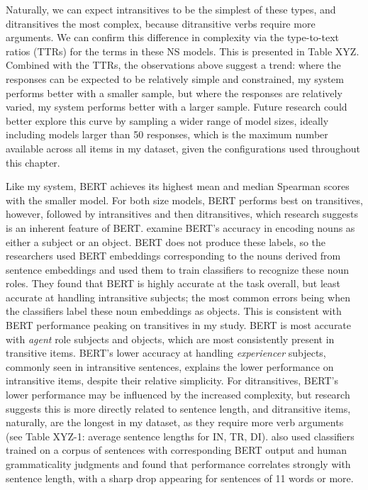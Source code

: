 Naturally, we can expect intransitives to be the simplest of these types, and ditransitives the most complex, because ditransitive verbs require more arguments. We can confirm this difference in complexity via the type-to-text ratios (TTRs) for the terms in these NS models. This is presented in Table XYZ. Combined with the TTRs, the observations above suggest a trend: where the responses can be expected to be relatively simple and constrained, my system performs better with a smaller sample, but where the responses are relatively varied, my system performs better with a larger sample. Future research could better explore this curve by sampling a wider range of model sizes, ideally including models larger than 50 responses, which is the maximum number available across all items in my dataset, given the configurations used throughout this chapter.

Like my system, BERT achieves its highest mean and median Spearman scores with the smaller model. For both size models, BERT performs best on transitives, however, followed by intransitives and then ditransitives, which research suggests is an inherent feature of BERT. \citet{papadimitriou2021multilingual} examine BERT's accuracy in encoding nouns as either a subject or an object. BERT does not produce these labels, so the researchers used BERT embeddings corresponding to the nouns derived from sentence embeddings and used them to train classifiers to recognize these noun roles. They found that BERT is highly accurate at the task overall, but least accurate at handling intransitive subjects; the most common errors being when the classifiers label these noun embeddings as objects. This is consistent with BERT performance peaking on transitives in my study. BERT is most accurate with \textit{agent} role subjects and objects, which are most consistently present in transitive items. BERT's lower accuracy at handling \textit{experiencer} subjects, commonly seen in intransitive sentences, explains the lower performance on intransitive items, despite their relative simplicity. For ditransitives, BERT's lower performance may be influenced by the increased complexity, but research suggests this is more directly related to sentence length, and ditransitive items, naturally, are the longest in my dataset, as they require more verb arguments (see Table XYZ-1: average sentence lengths for IN, TR, DI). \citet{warstadt2019} also used classifiers trained on a corpus of sentences with corresponding BERT output and human grammaticality judgments and found that performance correlates strongly with sentence length, with a sharp drop appearing for sentences of 11 words or more.


